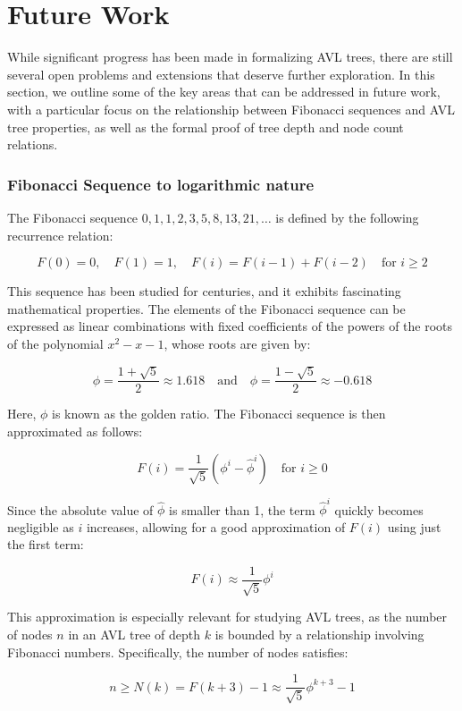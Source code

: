 \chapter{Future Work}\label{chap:LaTeXAdvice}
While significant progress has been made in formalizing AVL trees, there are still several open problems and extensions that deserve further exploration. In this section, we outline some of the key areas that can be addressed in future work, with a particular focus on the relationship between Fibonacci sequences and AVL tree properties, as well as the formal proof of tree depth and node count relations.

\subsection*{Fibonacci Sequence to logarithmic nature}

The Fibonacci sequence \( 0, 1, 1, 2, 3, 5, 8, 13, 21, \dots \) is defined by the following recurrence relation:

\[
F(0) = 0, \quad F(1) = 1, \quad F(i) = F(i - 1) + F(i - 2) \quad \text{for } i \geq 2
\]

This sequence has been studied for centuries, and it exhibits fascinating mathematical properties. The elements of the Fibonacci sequence can be expressed as linear combinations with fixed coefficients of the powers of the roots of the polynomial \( x^2 - x - 1 \), whose roots are given by:

\[
\phi = \frac{1 + \sqrt{5}}{2} \approx 1.618 \quad \text{and} \quad \hat{\phi} = \frac{1 - \sqrt{5}}{2} \approx -0.618
\]

Here, \( \phi \) is known as the golden ratio. The Fibonacci sequence is then approximated as follows:

\[
F(i) = \frac{1}{\sqrt{5}} \left( \phi^i - \hat{\phi}^i \right) \quad \text{for } i \geq 0
\]

Since the absolute value of \( \hat{\phi} \) is smaller than 1, the term \( \hat{\phi}^i \) quickly becomes negligible as \( i \) increases, allowing for a good approximation of \( F(i) \) using just the first term:

\[
F(i) \approx \frac{1}{\sqrt{5}} \phi^i
\]

This approximation is especially relevant for studying AVL trees, as the number of nodes \( n \) in an AVL tree of depth \( k \) is bounded by a relationship involving Fibonacci numbers. Specifically, the number of nodes satisfies:

\[
n \geq N(k) = F(k + 3) - 1 \approx \frac{1}{\sqrt{5}} \phi^{k+3} - 1
\]

